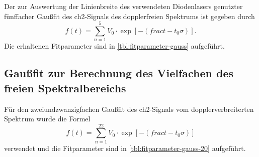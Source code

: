 \documentclass[../bericht.tex]{subfiles}
\begin{document}
\begin{appendices}
        Der zur Auswertung der Linienbreite des verwendeten Diodenlasers genutzter fünffacher Gau\ss{}fit des ch2-Signals des dopplerfreien Spektrums ist gegeben durch
        \begin{equation}
          f(t)=\sum_{n=1}^5 V_0 \cdot \exp \left[ -\left( frac{t-t_0}{\sigma} \right) \right].
          \label{eq:gaussfit}
        \end{equation}
        Die erhaltenen Fitparameter sind in \cref{tbl:fitparameter-gauss} aufgeführt.


      \subsection{Gau\ss{}fit zur Berechnung des Vielfachen des freien Spektralbereichs}
      \label{subsec:fit-freier-spektralbereich-dopplerverbreitert}

        Für den zweiundzwanzigfachen Gau\ss{}fit des ch2-Signals vom dopplerverbreiterten Spektrum wurde die Formel
        \begin{equation}
          f(t)=\sum_{n=1}^22 V_0 \cdot \exp \left[ -\left( frac{t-t_0}{\sigma} \right) \right]
          \label{eq:gaussfit20}
        \end{equation}
        verwendet und die Fitparameter sind in \cref{tbl:fitparameter-gauss-20} aufgeführt.


\end{appendices}
\end{document}
